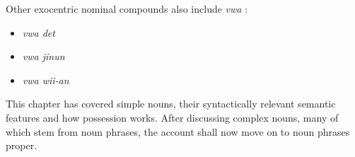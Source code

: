 Other exocentric nominal compounds also include \textit{vwa} :
\begin{itemize}
\item \textit{vwa det}  
\item \textit{vwa jinun}  
\item \textit{vwa wii-an}  
\end{itemize}

This chapter has covered simple nouns, their syntactically relevant semantic features and how possession works. After discussing complex nouns, many of which stem from noun phrases, the account shall now move on to noun phrases proper.

